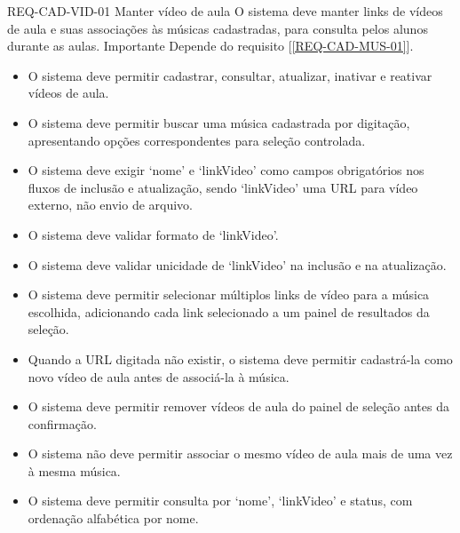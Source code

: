 \reqfunccad
{REQ-CAD-VID-01 Manter vídeo de aula}
{O sistema deve manter links de vídeos de aula e suas associações às músicas cadastradas, para consulta pelos alunos durante as aulas.}
{Importante}
{Depende do requisito [\ref{REQ-CAD-MUS-01}].}
{\begin{itemize}[leftmargin=0.6cm]
    \item O sistema deve permitir cadastrar, consultar, atualizar, inativar e reativar vídeos de aula.
    \item O sistema deve permitir buscar uma música cadastrada por digitação, apresentando opções correspondentes para seleção controlada.
    \item O sistema deve exigir `nome' e `linkVideo' como campos obrigatórios nos fluxos de inclusão e atualização, sendo `linkVideo' uma URL para vídeo externo, não envio de arquivo.
    \item O sistema deve validar formato de `linkVideo'.
    \item O sistema deve validar unicidade de `linkVideo' na inclusão e na atualização.
    \item O sistema deve permitir selecionar múltiplos links de vídeo para a música escolhida, adicionando cada link selecionado a um painel de resultados da seleção.
    \item Quando a URL digitada não existir, o sistema deve permitir cadastrá-la como novo vídeo de aula antes de associá-la à música.
    \item O sistema deve permitir remover vídeos de aula do painel de seleção antes da confirmação.
    \item O sistema não deve permitir associar o mesmo vídeo de aula mais de uma vez à mesma música.
    \item O sistema deve permitir consulta por `nome', `linkVideo' e status, com ordenação alfabética por nome.
\end{itemize}}


